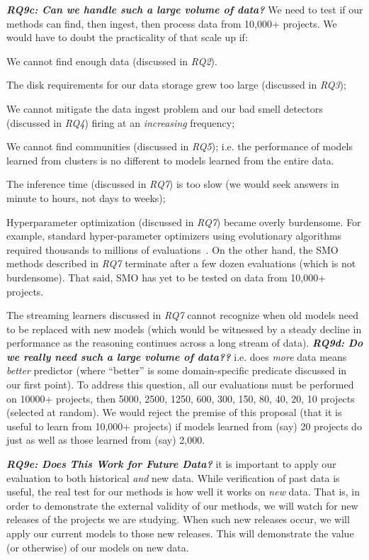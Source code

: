 \textit{\textbf{RQ9c: Can we handle such a large  volume of data?}} We need to test if our methods
can find, then ingest, then process data from  10,000+ projects. We would have to doubt the practicality of that scale up if:
\bi
\item We cannot find enough data (discussed in {\em RQ2}).
\item The disk requirements for our data storage grew too large (discussed in {\em RQ3}); 
\item We cannot mitigate the  data ingest problem and our
  bad smell detectors (discussed in {\em RQ4})    firing at an {\em increasing} frequency;
\item We cannot find communities (discussed in {\em RQ5}); i.e. the performance of  models learned from  clusters
 is no different to models learned from the entire data.
 \item The inference time (discussed in {\em RQ7}) is too slow (we would seek answers in minute to hours, not days to weeks);
\item Hyperparameter optimization (discussed in {\em RQ7}) became overly burdensome.
For example, standard hyper-parameter optimizers using evolutionary
algorithms required thousands to millions of evaluations~\cite{sarro2016multi}. 
On the other hand,
the SMO methods described in {\em RQ7} terminate after a few dozen evaluations (which is not burdensome). That said, SMO has yet to be    tested on data from 10,000+ projects.

\item The streaming learners  discussed in {\em RQ7} cannot recognize when
old models need to be replaced with new models (which would be witnessed by a steady decline in performance as the reasoning continues across a long stream of data).
\ei
\textit{\textbf{ RQ9d: Do we really need such  a large  volume of data??}} i.e. does {\em more}
data means {\em better} predictor (where ``better'' is some domain-specific predicate discussed in our first point). To address this question, all our evaluations must be performed on 10000+ projects,
then 5000, 2500, 1250, 600, 300, 150, 80, 40, 20, 10  projects (selected at random).
We would reject the premise of this proposal (that it is useful to learn from 10,000+ projects)
if models learned from (say) 20 projects do just as well as those learned from (say) 2,000.



\textit{\textbf{ RQ9e: Does This Work for Future Data?}}
it is important to apply our evaluation to both historical  {\em and } new data.
While verification of past data is useful, the real test for our methods is how well
it works on {\em new} data. That is, in order to demonstrate the external validity of our methods, we will watch for new releases of the projects we are studying. When such new releases occur, we will apply our current models to those new releases. This will demonstrate the value (or otherwise) of our models on new data.
 
